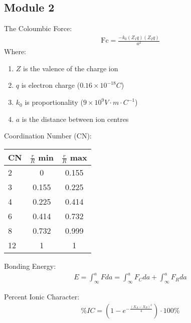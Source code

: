 \documentclass{article}
\begin{document}
\begin{multicols}{2}

\section{Module 2}

\normalsize
The Coloumbic Force:
\begin{equation*}
    \begin{split}
        \text{Fc} = \frac{-k_0(Z_1 q)(Z_2 q)}{a^2}
    \end{split}
\end{equation*}
Where:
\begin{enumerate}
    \item $Z$ is the valence of the charge ion
    \item $q$ is electron charge ($0.16 \times 10^{-18}C$)
    \item $k_0$ is proportionality ($9 \times 10^9 V \cdot m \cdot C^{-1}$)
    \item $a$ is the distance between ion centres
\end{enumerate}

Coordination Number (CN):

\begin{center}
    \begin{tabular}{ l c c }
        CN & $\frac{r}{R}$ min & $\frac{r}{R}$ max \\
        \hline
        2  &   0   & 0.155 \\ 
        3  & 0.155 & 0.225 \\  
        4  & 0.225 & 0.414 \\  
        6  & 0.414 & 0.732 \\  
        8  & 0.732 & 0.999 \\  
        12 &   1   &   1
    \end{tabular}
\end{center}


Bonding Energy:
\begin{equation*}
    \begin{split}
        E = \int_\infty^a F \textit{da}  
          = \int_\infty^a F_C \textit{da} + \int_\infty^a F_R \textit{da}
    \end{split}
\end{equation*}

Percent Ionic Character:
\begin{equation*}
    \begin{split}
        \%IC = (1-e^{-\frac{(X_A-X_B)^2}{4}}) \cdot 100\%
    \end{split}
\end{equation*}


\end{multicols}
\end{document}
